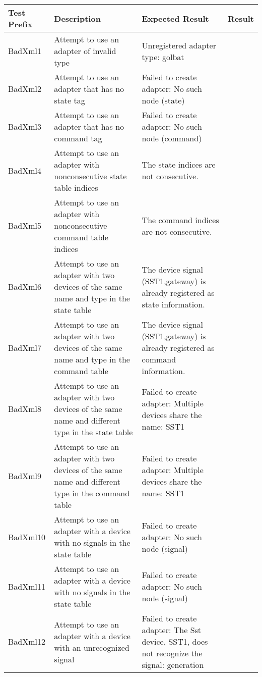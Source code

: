 \documentclass{article}
\begin{document}
%
\begin{center}
\begin{footnotesize}
\begin{longtable}{|p{3cm}|p{7cm}|p{7cm}|c|}
    \hline
    Test Prefix & Description & Expected Result & Result \\ \hline \endhead \hline \endfoot
    BadXml1 & Attempt to use an adapter of invalid type & Unregistered adapter type: golbat & \\
    BadXml2 & Attempt to use an adapter that has no state tag & Failed to create adapter: No such node (state) & \\
    BadXml3 & Attempt to use an adapter that has no command tag & Failed to create adapter: No such node (command) & \\
    BadXml4 & Attempt to use an adapter with nonconsecutive state table indices & The state indices are not consecutive. & \\
    BadXml5 & Attempt to use an adapter with nonconsecutive command table indices & The command indices are not consecutive. & \\
    BadXml6 & Attempt to use an adapter with two devices of the same name and type in the state table & The device signal (SST1,gateway) is already registered as state information. & \\
    BadXml7 & Attempt to use an adapter with two devices of the same name and type in the command table & The device signal (SST1,gateway) is already registered as command information. & \\
    BadXml8 & Attempt to use an adapter with two devices of the same name and different type in the state table & Failed to create adapter: Multiple devices share the name: SST1 & \\
    BadXml9 & Attempt to use an adapter with two devices of the same name and different type in the command table & Failed to create adapter: Multiple devices share the name: SST1 & \\
    BadXml10 & Attempt to use an adapter with a device with no signals in the state table & Failed to create adapter: No such node (signal) & \\
    BadXml11 & Attempt to use an adapter with a device with no signals in the state table & Failed to create adapter: No such node (signal) & \\
    BadXml12 & Attempt to use an adapter with a device with an unrecognized signal & Failed to create adapter: The Sst device, SST1, does not recognize the signal: generation & \\

\end{longtable}
\end{footnotesize}
\end{center}
\end{document}
